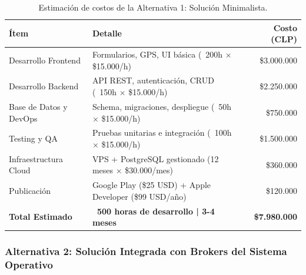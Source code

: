 \documentclass[12pt]{article}
\begin{document}
\begin{table}[h!]
    \centering
    \renewcommand{\arraystretch}{1.4}
    \begin{tabular}{|m{4cm}|m{5.5cm}|r|}
        \hline
        \rowcolor[HTML]{EFEFEF}
        \textbf{Ítem} & \textbf{Detalle} & \textbf{Costo (CLP)} \\ \hline
        Desarrollo Frontend & Formularios, GPS, UI básica (~200h $\times$ \$15.000/h) & \$3.000.000 \\ \hline
        Desarrollo Backend & API REST, autenticación, CRUD (~150h $\times$ \$15.000/h) & \$2.250.000 \\ \hline
        Base de Datos y DevOps & Schema, migraciones, despliegue (~50h $\times$ \$15.000/h) & \$750.000 \\ \hline
        Testing y QA & Pruebas unitarias e integración (~100h $\times$ \$15.000/h) & \$1.500.000 \\ \hline
        Infraestructura Cloud & VPS + PostgreSQL gestionado (12 meses $\times$ \$30.000/mes) & \$360.000 \\ \hline
        Publicación & Google Play (\$25 USD) + Apple Developer (\$99 USD/año) & \$120.000 \\ \hline
        \rowcolor[HTML]{E8F5E9}
        \textbf{Total Estimado} & \textbf{~500 horas de desarrollo | 3-4 meses} & \textbf{\$7.980.000} \\ \hline
    \end{tabular}
    \caption{Estimación de costos de la Alternativa 1: Solución Minimalista.}
    \label{tab:costos_alt1}
\end{table}

\newpage
\subsubsection{Alternativa 2: Solución Integrada con Brokers del Sistema Operativo}
\end{document}
